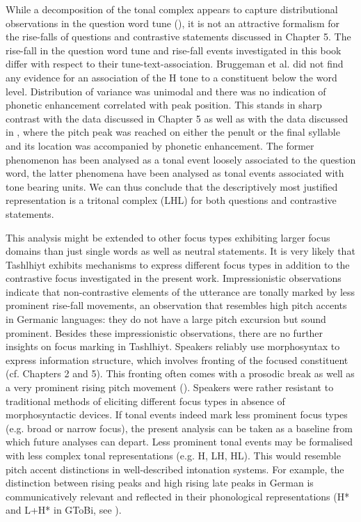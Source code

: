 \largerpage[-1]
While a decomposition of the tonal complex appears to capture distributional observations in the question word tune (\citealt{Bruggeman.etal2017}), it is not an attractive formalism for the rise-falls of questions and contrastive statements discussed in Chapter 5. The rise-fall in the question word tune and rise-fall events investigated in this book differ with respect to their tune-text-association. Bruggeman et al. did not find any evidence for an association of the H tone to a constituent below the word level. Distribution of variance was unimodal and there was no indication of phonetic enhancement correlated with peak position. This stands in sharp contrast with the data discussed in Chapter 5 as well as with the data discussed in \citet{Grice.etal2015tash}, where the pitch peak was reached on either the penult or the final syllable and its location was accompanied by phonetic enhancement. The former phenomenon has been analysed as a tonal event loosely associated to the question word, the latter phenomena have been analysed as tonal events associated with tone bearing units. We can thus conclude that the descriptively most justified representation is a tritonal complex (LHL) for both questions and contrastive statements. 

This analysis might be extended to other focus types exhibiting larger focus domains than just single words as well as neutral statements. It is very likely that Tashlhiyt exhibits mechanisms to express different focus types in addition to the contrastive focus investigated in the present work. Impressionistic observations indicate that non-contrastive elements of the utterance are tonally marked by less prominent rise-fall movements, an observation that resembles high pitch accents in Germanic languages: they do not have a large pitch excursion but sound prominent. Besides these impressionistic observations, there are no further insights on focus marking in Tashlhiyt. Speakers reliably use morphosyntax to express information structure, which involves fronting of the focused constituent (cf. Chapters 2 and 5). This fronting often comes with a prosodic break as well as a very prominent rising pitch movement (\citealt{Sadiqi1997,DE2002,MettouchiFleisch2010}). Speakers were rather resistant to traditional methods of eliciting different focus types in absence of morphosyntactic devices. If tonal events indeed mark less prominent focus types (e.g. broad or narrow focus), the present analysis can be taken as a baseline from which future analyses can depart. Less prominent tonal events may be formalised with less complex tonal representations (e.g. H, LH, HL). This would resemble pitch accent distinctions in well-described intonation systems. For example, the distinction between rising peaks and high rising late peaks in German is communicatively relevant and reflected in their phonological representations (H* and L+H* in GToBi, see \citealt{Grice.etal2005ger}).  


